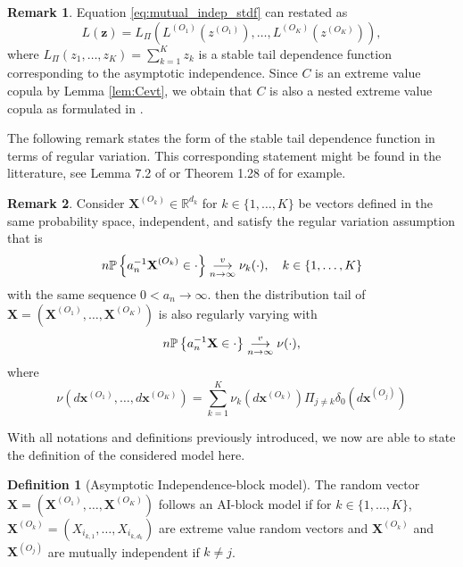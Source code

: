 \documentclass[11pt]{article}
\theoremstyle{definition}
\newtheorem{definition}{Definition}
\newtheorem{remark}{Remark}
\begin{document}
	\begin{remark}
		Equation \eqref{eq:mutual_indep_stdf} can restated as 
		\begin{equation*}
			L(\textbf{z}) = L_{\Pi} \left(L^{(O_1)}\left(z^{(O_1)}\right), \dots, L^{(O_K)}\left(z^{(O_K)}\right) \right),
		\end{equation*}
		where $L_{\Pi}(z_1, \dots, z_K) = \sum_{k=1}^K z_k$ is a stable tail dependence function corresponding to the asymptotic independence. Since $C$ is an extreme value copula by Lemma \ref{lem:Cevt}, we obtain that $C$ is also a nested extreme value copula as formulated in \cite{hofert2018hierarchical}.
	\end{remark}
	The following remark states the form of the stable tail dependence function in terms of regular variation. This corresponding statement might be found in the litterature, see Lemma 7.2 of \cite{resnick2007heavy} or Theorem 1.28 of \cite{lindskog2004multivariate} for example.	
	\begin{remark}
		Consider $\textbf{X}^{(O_k)} \in \mathbb{R}^{d_k}$ for $k \in \{1,\dots,K\}$ be vectors defined in the same probability space, independent, and satisfy the regular variation assumption that is
		\begin{equation*}
			n \mathbb{P}\left\{ a_n^{-1} \textbf{X}^{(O_k)} \in \cdot \right\} \overunderset{v}{n \rightarrow \infty}{\longrightarrow} \nu_k(\cdot), \quad k \in \{1,\dots,K\}
		\end{equation*}
		with the same sequence $0< a_n \rightarrow \infty$. then the distribution tail of $\textbf{X} = (\textbf{X}^{(O_1)}, \dots, \textbf{X}^{(O_K)})$ is also regularly varying with 
		\begin{equation*}
			n \mathbb{P}\left\{ a_n^{-1} \textbf{X} \in \cdot \right\} \overunderset{v}{n \rightarrow \infty}{\longrightarrow} \nu(\cdot),
		\end{equation*}
		where
		\begin{equation*}
			\nu(d\textbf{x}^{(O_1)}, \dots, d\textbf{x}^{(O_K)}) = \sum_{k=1}^K \nu_k \left(d \textbf{x}^{(O_k)} \right ) \Pi_{j \neq k} \delta_0\left(d \textbf{x}^{(O_j)}\right)
		\end{equation*}
	\end{remark}
	
	With all notations and definitions previously introduced, we now are able to state the definition of the considered model here.
	
	\begin{definition}[Asymptotic Independence-block model]
		 The random vector $\textbf{X} = (\textbf{X}^{(O_1)}, \dots, \textbf{X}^{(O_K)})$ follows an AI-block model if for $k \in \{1,\dots,K\}$, $\textbf{X}^{(O_k)} = (X_{i_{k,1}}, \dots, X_{i_{k,d_k}})$ are extreme value random vectors and $\textbf{X}^{(O_k)}$ and $\textbf{X}^{(O_j)}$ are mutually independent if $k \neq j$.
	\end{definition}
	
\end{document}
